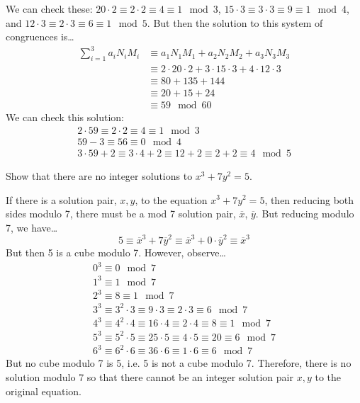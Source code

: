 \documentclass[11pt,letterpaper]{article}
\begin{document}
We can check these: $20 \cdot 2 \equiv 2 \cdot 2 \equiv 4 \equiv 1 \mod 3$, $15 \cdot 3 \equiv 3 \cdot 3 \equiv 9 \equiv 1 \mod 4$, and $12 \cdot 3 \equiv 2 \cdot 3 \equiv 6 \equiv 1 \mod 5$. But then the solution to this system of congruences is\dots
	\[
	\begin{aligned}
	\sum_{i=1}^3 a_i N_i M_i &\equiv a_1N_1M_1 + a_2N_2M_2 + a_3N_3M_3 \\
	&\equiv 2 \cdot 20 \cdot 2 + 3 \cdot 15 \cdot 3 + 4 \cdot 12 \cdot 3 \\
	&\equiv 80 + 135 + 144 \\
	&\equiv 20 + 15 + 24 \\
	&\equiv 59 \mod 60
	\end{aligned}
	\]
We can check this solution:
	\[
	\begin{aligned}
	2 \cdot 59 \equiv 2 \cdot 2 \equiv 4 \equiv 1 \mod 3 \\
	59 - 3 \equiv 56 \equiv 0 \mod 4 \\
	3 \cdot 59 + 2 \equiv 3 \cdot 4 + 2 \equiv 12 + 2 \equiv 2 + 2 \equiv 4 \mod 5
	\end{aligned}
	\]



\newpage



 Show that there are no integer solutions to $x^3 + 7y^2= 5$. \pspace

\sol If there is a solution pair, $x, y$, to the equation $x^3 + 7y^2= 5$, then reducing both sides modulo 7, there must be a mod 7 solution pair, $\overline{x}$, $\overline{y}$. But reducing modulo 7, we have\dots
	\[
	5 \equiv \overline{x}^3 + 7 \overline{y}^2 \equiv \overline{x}^3 + 0 \cdot \overline{y}^2 \equiv \overline{x}^3
	\]
But then 5 is a cube modulo 7. However, observe\dots
	\[
	\begin{aligned}
	0^3 \equiv 0 \mod 7 \\
	1^3 \equiv 1 \mod 7 \\
	2^3 \equiv 8 \equiv 1 \mod 7 \\
	3^3 \equiv 3^2 \cdot 3 \equiv 9 \cdot 3 \equiv 2 \cdot 3 \equiv 6 \mod 7 \\
	4^3 \equiv 4^2 \cdot 4 \equiv 16 \cdot 4 \equiv 2 \cdot 4 \equiv 8 \equiv 1 \mod 7 \\
	5^3 \equiv 5^2 \cdot 5 \equiv 25 \cdot 5 \equiv 4 \cdot 5 \equiv 20 \equiv 6 \mod 7 \\
	6^3 \equiv 6^2 \cdot 6 \equiv 36 \cdot 6 \equiv 1 \cdot 6 \equiv 6 \mod 7
	\end{aligned}
	\]
But no cube modulo 7 is 5, i.e. 5 is not a cube modulo 7. Therefore, there is no solution modulo 7 so that there cannot be an integer solution pair $x, y$ to the original equation. 
\end{document}
